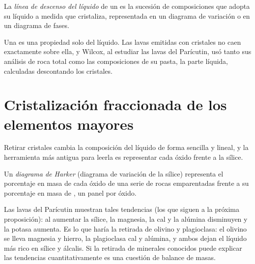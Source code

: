 \begin{definition}\label{def:b2:magmatic-differentiation:lld}
La \emph{línea de descenso del líquido} de un  es la
sucesión de composiciones que adopta su líquido a medida que cristaliza, representada en un
diagrama de variación o en un diagrama de fases.
\end{definition}

Una  es una propiedad solo del líquido. Las lavas emitidas con
cristales no caen exactamente sobre ella, y Wilcox, al estudiar las lavas del
Parícutin, usó tanto sus análisis de roca total como las composiciones de su
pasta, la parte líquida, calculadas descontando los cristales.

\section{Cristalización fraccionada de los elementos mayores}\label{sec:b2:magmatic-differentiation:majors}

Retirar cristales cambia la composición del líquido de forma sencilla y lineal,
y la herramienta más antigua para leerla es representar cada óxido frente a la sílice.

\begin{definition}\label{def:b2:magmatic-differentiation:harker}
Un \emph{diagrama de Harker} (diagrama de variación de la sílice) representa el
porcentaje en masa de cada óxido de una serie de rocas emparentadas frente a su porcentaje
en masa de , un panel por óxido.
\end{definition}


Las lavas del Parícutin muestran tales tendencias (los  que siguen a la
próxima proposición): al aumentar la sílice, la magnesia, la cal y la alúmina disminuyen y la potasa aumenta. Es
lo que haría la retirada de olivino y plagioclasa:
el olivino se lleva magnesia y hierro, la plagioclasa cal y alúmina, y ambos dejan
el líquido más rico en sílice y álcalis. Si la retirada de minerales conocidos puede
explicar las tendencias cuantitativamente es una cuestión de balance de masas.

